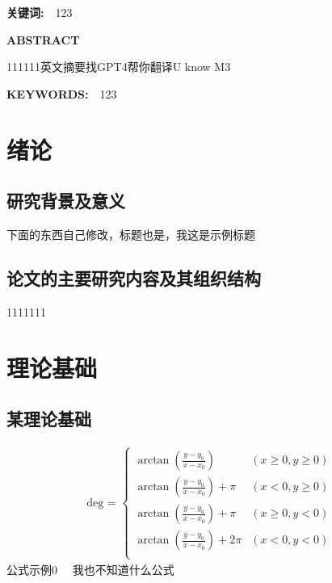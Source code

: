 \documentclass[UTF8,a4paper,12pt]{ctexart}
\begin{document}
	\vspace{0.2cm}
	\par \textbf{\fontsize{14pt}{\baselineskip}\heiti 关键词:　}123
	\setcounter{page}{1}
	\newpage
	\centerline{\textbf{\fontsize{16pt}{\baselineskip}ABSTRACT}}
	\vspace{0.4cm}
	111111英文摘要找GPT4帮你翻译U know M3
	\vspace{0.4cm}
	\par \textbf{\fontsize{14pt}{\baselineskip}KEYWORDS:　}123
	\newpage
	\setcounter{page}{1}
	\section{\fontsize{16pt}{\baselineskip}\heiti 绪论}
	\subsection{\fontsize{14pt}{\baselineskip}\heiti 研究背景及意义}
	下面的东西自己修改，标题也是，我这是示例标题
	
	\subsection{\fontsize{14pt}{\baselineskip}\heiti 论文的主要研究内容及其组织结构}
	1111111
	
	\section{\fontsize{16pt}{\baselineskip}\heiti 理论基础}
	
	\subsection{\fontsize{14pt}{\baselineskip}\heiti 某理论基础}
	\begin{equation}
		\begin{array}{c}
			\text {deg  = }\left\{\begin{array}{lc}
				\arctan (\frac{y-y_{0}}{x-x_{0}}) & (x\ge 0,y\ge 0) \\
				\arctan (\frac{y-y_{0}}{x-x_{0}})+\pi & (x<  0,y\ge 0) \\
				\arctan (\frac{y-y_{0}}{x-x_{0}})+\pi & (x\ge 0,y<  0) \\
				\arctan (\frac{y-y_{0}}{x-x_{0}})+2\pi & (x<  0,y<  0) \\
			\end{array}\right.
		\end{array}
	\end{equation}
	公式示例0  \ \  我也不知道什么公式
\end{document}
